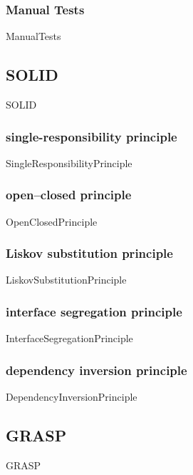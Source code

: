 \documentclass{article}
\begin{document}
        \subsubsection{Manual Tests}
            {ManualTests}

    \subsection{SOLID}
        {SOLID}

        \subsubsection{single-responsibility principle}
            {SingleResponsibilityPrinciple}
        
        \subsubsection{open–closed principle}
            {OpenClosedPrinciple}
        
        \subsubsection{Liskov substitution principle}
            {LiskovSubstitutionPrinciple}
        
        \subsubsection{interface segregation principle}
            {InterfaceSegregationPrinciple}
        
        \subsubsection{dependency inversion principle}
            {DependencyInversionPrinciple}

    \subsection{GRASP}
        {GRASP}
\end{document}
